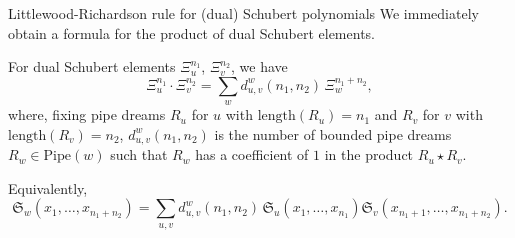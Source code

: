 \documentclass[aspectratio=169]{beamer}
\newcommand{\coma}{\mathbf{S}}
\newcommand{\dcoma}{\mathcal{DS}}
\newcommand{\Sch}[1]{\Xi_{#1}}
\newcommand{\sch}{\mathfrak{S}}
\newcommand{\RC}{\mathrm{Pipe}}
\newcommand{\hr}{\mathrm{length}}
\newcommand{\wtt}{\mathtt{wt}}
\begin{document}

\begin{frame}{Littlewood-Richardson rule for (dual) Schubert polynomials}
We immediately obtain a formula for the product of dual Schubert elements.

\begin{theorem}[S, 2026+]
For dual Schubert elements $\Sch{u}^{n_1}$, $\Sch{v}^{n_2}$, we have
\[
\Sch{u}^{n_1}\cdot \Sch{v}^{n_2}
=
\sum_{w} d_{u,v}^{w}(n_1, n_2)\,\Sch{w}^{n_1 + n_2},
\]
where, fixing pipe dreams $R_u$ for $u$ with $\hr(R_u) = n_1$ and $R_v$ for $v$ with $\hr(R_v) = n_2$, $d_{u,v}^{w}(n_1, n_2)$ is the number of bounded pipe dreams $R_w\in\RC(w)$ such that $R_w$ has a coefficient of $1$ in the product $R_u\star R_v$.

Equivalently,
$$\sch_w(x_1,\ldots,x_{n_1+n_2}) = \sum_{u,v} d_{u,v}^{w}(n_1, n_2)\,\sch_u(x_1,\ldots,x_{n_1})\sch_v(x_{n_1+1},\ldots,x_{n_1+n_2}).$$
\end{theorem}

\end{frame}

\end{document}
